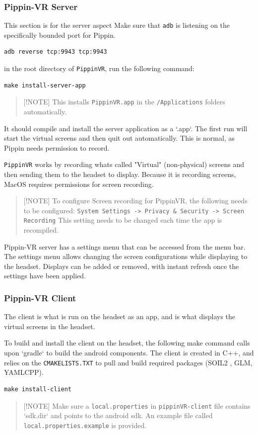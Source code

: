\documentclass[11pt]{article}
\begin{document}
\subsubsection{Pippin-VR Server}
\label{sec:org9639605}
This section is for the server aspect
Make sure that \texttt{adb} is listening on the specifically bounded port for Pippin.
\begin{verbatim}
adb reverse tcp:9943 tcp:9943
\end{verbatim}
in the root directory of \texttt{PippinVR}, run the following command:
\begin{verbatim}
make install-server-app
\end{verbatim}
\begin{quote}
{[}!NOTE]
This installs \texttt{PippinVR.app} in the \texttt{/Applications} folders automatically.
\end{quote}
It should compile and install the server application as a `.app`. The first run will start the virtual screens and then quit out automatically. This is normal, as Pippin needs permission to record.

\texttt{PippinVR} works by recording whats called "Virtual" (non-physical) screens and then sending them to the headset to display. Because it is recording screens, MacOS requires permissions for screen recording.
\begin{quote}
{[}!NOTE]
To configure Screen recording for PippinVR, the following needs to be configured:
   \texttt{System Settings -> Privacy \& Security -> Screen Recording}
This setting needs to be changed  each time the app is recompiled.
\end{quote}

Pippin-VR server has a settings menu that can be accessed from the menu bar. The settings menu allows changing the screen configurations while displaying to the headset. Displays can be added or removed, with instant refresh once the settings have been applied.
\subsubsection{Pippin-VR Client}
\label{sec:org7f6f53b}
The client is what is run on the headset as an app, and is what displays the virtual screens in the headset.

To build and install the client on the headset, the following make command calls upon `gradle` to build the android components. The client is created in C++, and relies on the \texttt{CMAKELISTS.TXT} to pull and build required packages (SOIL2 , GLM, YAMLCPP).
\begin{verbatim}
make install-client
\end{verbatim}
\begin{quote}
{[}!NOTE]
Make sure a \texttt{local.properties} in \texttt{pippinVR-client} file contains `sdk.dir` and points to the android sdk. An example file called \texttt{local.properties.example} is provided.
\end{quote}
\end{document}
